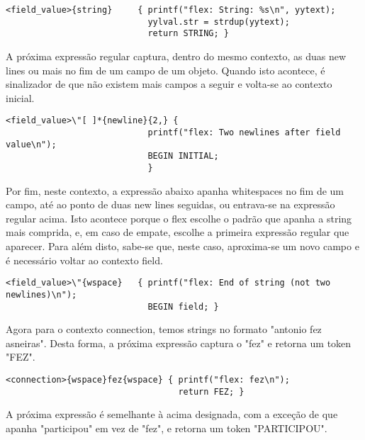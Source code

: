 \documentclass[a4paper]{article}
\begin{document}
\lstset{language=tex}
\begin{lstlisting}
<field_value>{string}     { printf("flex: String: %s\n", yytext);
                            yylval.str = strdup(yytext); 
                            return STRING; }
\end{lstlisting}


\bigskip
\par A próxima expressão regular captura, dentro do mesmo contexto, as duas new lines ou mais no fim de um campo de um objeto. Quando isto acontece, é sinalizador de que não existem mais campos a seguir e volta-se ao contexto inicial.

\lstset{language=tex}
\begin{lstlisting}
<field_value>\"[ ]*{newline}{2,} { 
                            printf("flex: Two newlines after field value\n");      
                            BEGIN INITIAL; 
                            }
\end{lstlisting}


\bigskip
\par Por fim, neste contexto, a expressão abaixo apanha whitespaces no fim de um campo, até ao ponto de duas new lines seguidas, ou entrava-se na expressão regular acima. Isto acontece porque o flex escolhe o padrão que apanha a string mais comprida, e, em caso de empate, escolhe a primeira expressão regular que aparecer. Para além disto, sabe-se que, neste caso, aproxima-se um novo campo e é necessário voltar ao contexto field.

\lstset{language=tex}
\begin{lstlisting}
<field_value>\"{wspace}   { printf("flex: End of string (not two newlines)\n");    
                            BEGIN field; }
\end{lstlisting}


\pagebreak
\par Agora para o contexto connection, temos strings no formato "antonio fez asneiras". Desta forma, a próxima expressão captura o "fez" e retorna um token "FEZ".

\lstset{language=tex}
\begin{lstlisting}
<connection>{wspace}fez{wspace} { printf("flex: fez\n");
                                  return FEZ; }

\end{lstlisting}


\bigskip
\par A próxima expressão é semelhante à acima designada, com a exceção de que apanha "participou" em vez de "fez", e retorna um token "PARTICIPOU".
\end{document}
